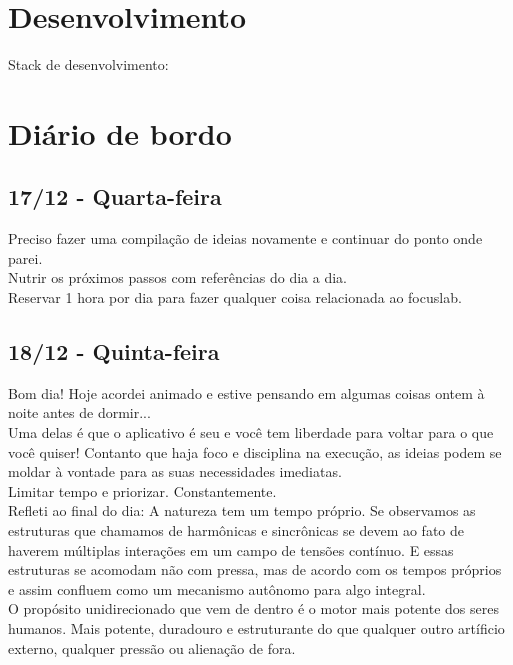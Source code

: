 \documentclass[11pt]{article}
\begin{document}
\section{Desenvolvimento}

Stack de desenvolvimento:

\section{Diário de bordo}

\subsection{17/12 - Quarta-feira}

Preciso fazer uma compilação de ideias novamente e continuar do ponto onde parei.\\

Nutrir os próximos passos com referências do dia a dia.\\

Reservar 1 hora por dia para fazer qualquer coisa relacionada ao focuslab.

\subsection{18/12 - Quinta-feira}

Bom dia! Hoje acordei animado e estive pensando em algumas coisas ontem à noite antes de dormir...\\

Uma delas é que o aplicativo é seu e você tem liberdade para voltar para o que você quiser! Contanto que haja foco e disciplina na execução, as ideias podem se moldar à vontade para as suas necessidades imediatas.\\

Limitar tempo e priorizar. Constantemente.\\

Refleti ao final do dia: A natureza tem um tempo próprio. Se observamos as estruturas que chamamos de harmônicas e sincrônicas se devem ao fato de haverem múltiplas interações em um campo de tensões contínuo. E essas estruturas se acomodam não com pressa, mas de acordo com os tempos próprios e assim confluem como um mecanismo autônomo para algo integral.\\

O propósito unidirecionado que vem de dentro é o motor mais potente dos seres humanos. Mais potente, duradouro e estruturante do que qualquer outro artíficio externo, qualquer pressão ou alienação de fora.\\
\end{document}
